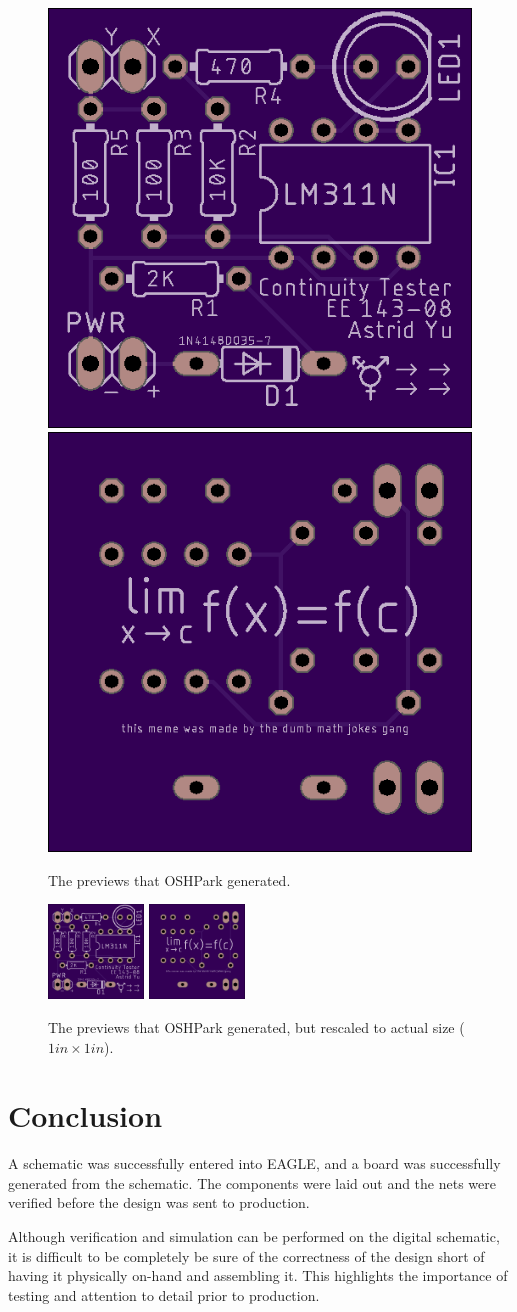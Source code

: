 \documentclass[12pt]{article}
\begin{document}
\begin{enumerate}[a)]
        \begin{figure}[H]
            \centering
            \includegraphics[width=0.4\linewidth]{preview-top.png}
            \includegraphics[width=0.4\linewidth]{preview-bottom.png}
            \caption{The previews that OSHPark generated.}
            \label{fig:preview}
        \end{figure}
        \begin{figure}[H]
            \centering
            \includegraphics[width=1in]{preview-top.png}
            \includegraphics[width=1in]{preview-bottom.png}
            \caption{The previews that OSHPark generated, but rescaled to actual size ($1in\times 1in$).}
            \label{fig:preview-actual}
        \end{figure}
\end{enumerate}

\section{Conclusion}

A schematic was successfully entered into EAGLE, and a board was successfully generated 
from the schematic. The components were laid out and the nets were verified before 
the design was sent to production. 

Although verification and simulation can be performed on the digital schematic, it is difficult
to be completely be sure of the correctness of the design short of having it 
physically on-hand and assembling it. This highlights the importance of testing and attention
to detail prior to production.
\end{document}
